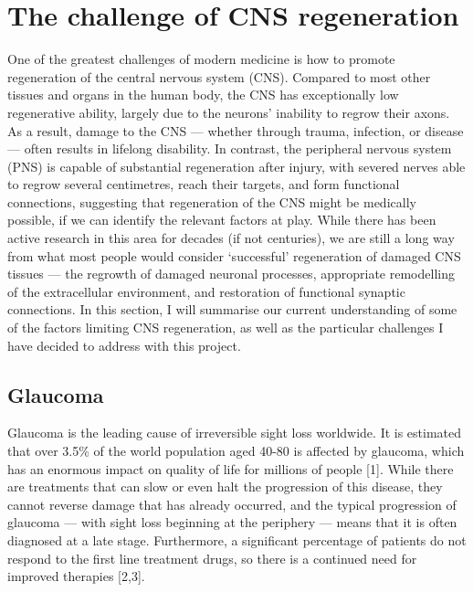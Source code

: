 \documentclass[
  12pt,
  a4paper,
]{book}
\begin{document}

\hypertarget{the-challenge-of-cns-regeneration}{%
\section{The challenge of CNS regeneration}\label{the-challenge-of-cns-regeneration}}

One of the greatest challenges of modern medicine is how to promote regeneration of the central nervous system (CNS). Compared to most other tissues and organs in the human body, the CNS has exceptionally low regenerative ability, largely due to the neurons' inability to regrow their axons. As a result, damage to the CNS --- whether through trauma, infection, or disease --- often results in lifelong disability. In contrast, the peripheral nervous system (PNS) is capable of substantial regeneration after injury, with severed nerves able to regrow several centimetres, reach their targets, and form functional connections, suggesting that regeneration of the CNS might be medically possible, if we can identify the relevant factors at play. While there has been active research in this area for decades (if not centuries), we are still a long way from what most people would consider `successful' regeneration of damaged CNS tissues --- the regrowth of damaged neuronal processes, appropriate remodelling of the extracellular environment, and restoration of functional synaptic connections. In this section, I will summarise our current understanding of some of the factors limiting CNS regeneration, as well as the particular challenges I have decided to address with this project.

\hypertarget{glaucoma}{%
\subsection{Glaucoma}\label{glaucoma}}

Glaucoma is the leading cause of irreversible sight loss worldwide. It is estimated that over 3.5\% of the world population aged 40-80 is affected by glaucoma, which has an enormous impact on quality of life for millions of people {[}1{]}. While there are treatments that can slow or even halt the progression of this disease, they cannot reverse damage that has already occurred, and the typical progression of glaucoma --- with sight loss beginning at the periphery --- means that it is often diagnosed at a late stage. Furthermore, a significant percentage of patients do not respond to the first line treatment drugs, so there is a continued need for improved therapies {[}2,3{]}.
\end{document}
